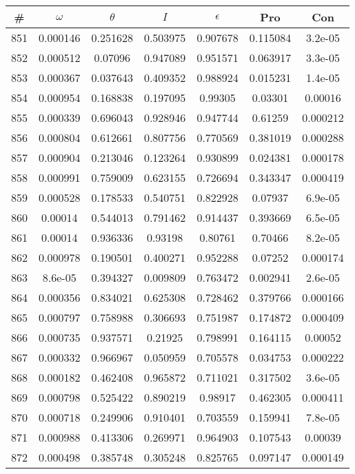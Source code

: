 \newpage
\begin{table}
\begin{tabular}{c|c|c|c|c|c|c}
\# & $\omega$ & $\theta$ & $I$ & $\epsilon$ & Pro & Con\\
\hline
851 & 0.000146 & 0.251628 & 0.503975 & 0.907678 & 0.115084 & 3.2e-05\\
852 & 0.000512 & 0.07096 & 0.947089 & 0.951571 & 0.063917 & 3.3e-05\\
853 & 0.000367 & 0.037643 & 0.409352 & 0.988924 & 0.015231 & 1.4e-05\\
854 & 0.000954 & 0.168838 & 0.197095 & 0.99305 & 0.03301 & 0.00016\\
855 & 0.000339 & 0.696043 & 0.928946 & 0.947744 & 0.61259 & 0.000212\\
856 & 0.000804 & 0.612661 & 0.807756 & 0.770569 & 0.381019 & 0.000288\\
857 & 0.000904 & 0.213046 & 0.123264 & 0.930899 & 0.024381 & 0.000178\\
858 & 0.000991 & 0.759009 & 0.623155 & 0.726694 & 0.343347 & 0.000419\\
859 & 0.000528 & 0.178533 & 0.540751 & 0.822928 & 0.07937 & 6.9e-05\\
860 & 0.00014 & 0.544013 & 0.791462 & 0.914437 & 0.393669 & 6.5e-05\\
861 & 0.00014 & 0.936336 & 0.93198 & 0.80761 & 0.70466 & 8.2e-05\\
862 & 0.000978 & 0.190501 & 0.400271 & 0.952288 & 0.07252 & 0.000174\\
863 & 8.6e-05 & 0.394327 & 0.009809 & 0.763472 & 0.002941 & 2.6e-05\\
864 & 0.000356 & 0.834021 & 0.625308 & 0.728462 & 0.379766 & 0.000166\\
865 & 0.000797 & 0.758988 & 0.306693 & 0.751987 & 0.174872 & 0.000409\\
866 & 0.000735 & 0.937571 & 0.21925 & 0.798991 & 0.164115 & 0.00052\\
867 & 0.000332 & 0.966967 & 0.050959 & 0.705578 & 0.034753 & 0.000222\\
868 & 0.000182 & 0.462408 & 0.965872 & 0.711021 & 0.317502 & 3.6e-05\\
869 & 0.000798 & 0.525422 & 0.890219 & 0.98917 & 0.462305 & 0.000411\\
870 & 0.000718 & 0.249906 & 0.910401 & 0.703559 & 0.159941 & 7.8e-05\\
871 & 0.000988 & 0.413306 & 0.269971 & 0.964903 & 0.107543 & 0.00039\\
872 & 0.000498 & 0.385748 & 0.305248 & 0.825765 & 0.097147 & 0.000149\\

\end{tabular}
\end{table}
